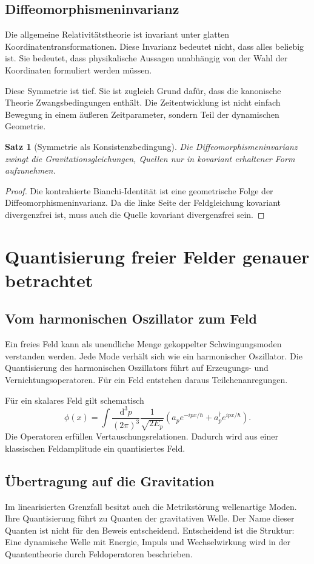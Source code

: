 \documentclass[11pt,a4paper,openany]{book}
\newtheorem{satz}{Satz}[chapter]
\theoremstyle{remark}
\newcommand{\diff}{\mathrm{d}}
\begin{document}
\section{Diffeomorphismeninvarianz}
Die allgemeine Relativitätstheorie ist invariant unter glatten Koordinatentransformationen. Diese Invarianz bedeutet nicht, dass alles beliebig ist. Sie bedeutet, dass physikalische Aussagen unabhängig von der Wahl der Koordinaten formuliert werden müssen.

Diese Symmetrie ist tief. Sie ist zugleich Grund dafür, dass die kanonische Theorie Zwangsbedingungen enthält. Die Zeitentwicklung ist nicht einfach Bewegung in einem äußeren Zeitparameter, sondern Teil der dynamischen Geometrie.

\begin{satz}[Symmetrie als Konsistenzbedingung]
Die Diffeomorphismeninvarianz zwingt die Gravitationsgleichungen, Quellen nur in kovariant erhaltener Form aufzunehmen.
\end{satz}
\begin{proof}
Die kontrahierte Bianchi-Identität ist eine geometrische Folge der Diffeomorphismeninvarianz. Da die linke Seite der Feldgleichung kovariant divergenzfrei ist, muss auch die Quelle kovariant divergenzfrei sein.
\end{proof}

\chapter{Quantisierung freier Felder genauer betrachtet}
\section{Vom harmonischen Oszillator zum Feld}
Ein freies Feld kann als unendliche Menge gekoppelter Schwingungsmoden verstanden werden. Jede Mode verhält sich wie ein harmonischer Oszillator. Die Quantisierung des harmonischen Oszillators führt auf Erzeugungs- und Vernichtungsoperatoren. Für ein Feld entstehen daraus Teilchenanregungen.

Für ein skalares Feld gilt schematisch
\begin{equation}
\phi(x)=\int \frac{\diff^3p}{(2\pi)^3}\frac{1}{\sqrt{2E_p}}\left(a_p e^{-ipx/\hbar}+a_p^\dagger e^{ipx/\hbar}\right).
\end{equation}
Die Operatoren erfüllen Vertauschungsrelationen. Dadurch wird aus einer klassischen Feldamplitude ein quantisiertes Feld.

\section{Übertragung auf die Gravitation}
Im linearisierten Grenzfall besitzt auch die Metrikstörung wellenartige Moden. Ihre Quantisierung führt zu Quanten der gravitativen Welle. Der Name dieser Quanten ist nicht für den Beweis entscheidend. Entscheidend ist die Struktur: Eine dynamische Welle mit Energie, Impuls und Wechselwirkung wird in der Quantentheorie durch Feldoperatoren beschrieben.
\end{document}

